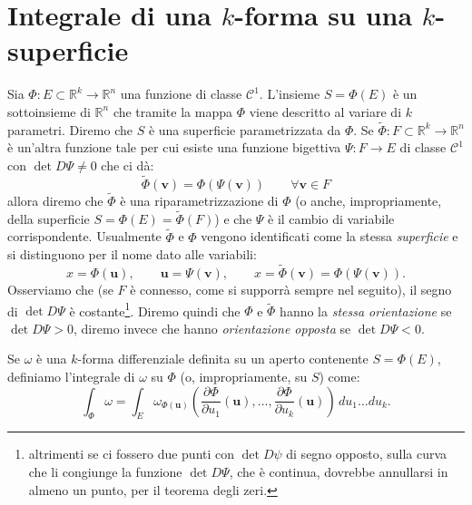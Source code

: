 \documentclass[italian,a4paper]{scrartcl}
\newcommand{\RR}{{\mathbb R}}
\newcommand{\defeq}{=}
\renewcommand{\vec}{\mathbf}
\begin{document}
\section{Integrale di una $k$-forma su una $k$-superficie}

Sia $\Phi\colon E\subset \RR^k\to \RR^n$ una funzione di classe
$\mathcal C^1$. L'insieme $S=\Phi(E)$ è un sottoinsieme di $\RR^n$ che
tramite la mappa $\Phi$ viene descritto al variare di $k$
parametri. Diremo che $S$ è una superficie parametrizzata da
$\Phi$. Se $\tilde\Phi \colon F\subset \RR^k\to \RR^n$ è un'altra
funzione tale per cui esiste una funzione bigettiva $\Psi\colon F\to
E$ di classe $\mathcal C^1$ con $\det D\Psi \neq 0$
che ci dà:
\[
  \tilde\Phi(\vec v) = \Phi(\Psi(\vec v)) \qquad \forall \vec v\in F
\]
allora diremo che $\tilde\Phi$ è una riparametrizzazione di $\Phi$ (o
anche, impropriamente, della superficie $S=\Phi(E) = \tilde\Phi(F)$) e
che $\Psi$ è il cambio di variabile corrispondente. Usualmente $\tilde
\Phi$ e $\Phi$ vengono identificati come la stessa \emph{superficie} e
si distinguono per il nome dato alle variabili:
\[
  x = \Phi(\vec u), \qquad \vec u = \Psi(\vec v), \qquad x =
  \tilde\Phi (\vec v) = \Phi(\Psi(\vec v)).
\]
Osserviamo che (se $F$ è connesso, come si supporrà sempre nel
seguito), il segno di $\det D\Psi$ è costante\footnote{altrimenti se ci
fossero due punti con $\det D\psi$ di segno opposto,
sulla curva che li congiunge la
funzione $\det D\Psi$, che è continua, dovrebbe annullarsi in almeno
un punto, per il teorema degli zeri.}. Diremo quindi che $\Phi$ e
$\tilde\Phi$ hanno la \emph{stessa orientazione} se $\det D\Psi>0$,
diremo invece che hanno \emph{orientazione opposta} se $\det D\Psi<0$.

Se $\omega$ è una $k$-forma differenziale definita su un aperto contenente
$S=\Phi(E)$, definiamo l'integrale di $\omega$ su $\Phi$ (o,
impropriamente, su $S$) come:
\[
\int_\Phi \omega \defeq \int_E \omega_{\Phi(\vec u)}\left(\frac{\partial
  \Phi}{\partial u_1}(\vec u), \dots, \frac{\partial \Phi}{\partial
  u_k}(\vec u)\right)\, du_1 \dots du_k.
\]
\end{document}
